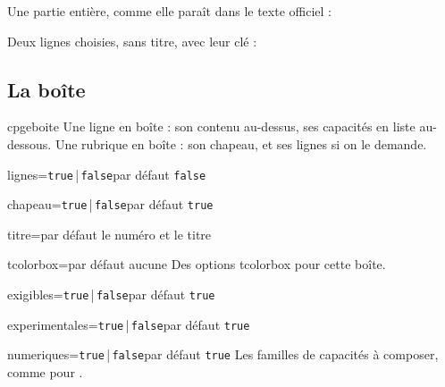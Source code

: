 \documentclass[a4paper,11pt]{article}
\newcommand\pkg[1]{\textsf{#1}}
\begin{document}
Une partie entière, comme elle paraît dans le texte officiel :

\begin{dispListing}
\end{dispListing}


Deux lignes choisies, sans titre, avec leur clé :

\begin{dispExample}
\end{dispExample}

\subsection{La boîte}

\begin{docCommand}{cpgeboite}{}
  Une ligne en boîte : son contenu au-dessus, ses capacités en liste
  au-dessous. Une rubrique en boîte : son chapeau, et ses lignes si on le
  demande.
  \begin{docKey}{lignes}{=\texttt{true}\,|\,\texttt{false}}{par défaut \texttt{false}}\end{docKey}
  \begin{docKey}{chapeau}{=\texttt{true}\,|\,\texttt{false}}{par défaut \texttt{true}}\end{docKey}
  \begin{docKey}{titre}{=}{par défaut le numéro et le titre}\end{docKey}
  \begin{docKey}{tcolorbox}{=}{par défaut aucune}
    Des options \pkg{tcolorbox} pour cette boîte.
  \end{docKey}
  \begin{docKey}{exigibles}{=\texttt{true}\,|\,\texttt{false}}{par défaut \texttt{true}}\end{docKey}
  \begin{docKey}{experimentales}{=\texttt{true}\,|\,\texttt{false}}{par défaut \texttt{true}}\end{docKey}
  \begin{docKey}{numeriques}{=\texttt{true}\,|\,\texttt{false}}{par défaut \texttt{true}}
    Les familles de capacités à composer, comme pour .
  \end{docKey}
\end{docCommand}
\end{document}
